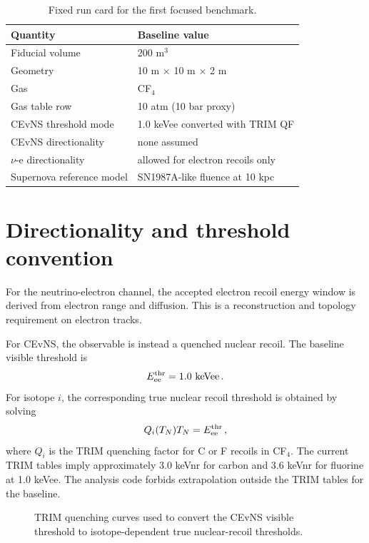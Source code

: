 \documentclass[a4paper,11pt]{article}
\begin{document}
\begin{table}[htbp]
\centering
\begin{tabular}{ll}
\hline
Quantity & Baseline value \\
\hline
Fiducial volume & 200 m$^3$ \\
Geometry & 10 m $\times$ 10 m $\times$ 2 m \\
Gas & CF$_4$ \\
Gas table row & 10 atm (10 bar proxy) \\
CEvNS threshold mode & 1.0 keVee converted with TRIM QF \\
CEvNS directionality & none assumed \\
$\nu$-e directionality & allowed for electron recoils only \\
Supernova reference model & SN1987A-like fluence at 10 kpc \\
\hline
\end{tabular}
\caption{Fixed run card for the first focused benchmark.}
\label{tab:run-card}
\end{table}

\section{Directionality and threshold convention}
\label{sec:thresholds}

For the neutrino-electron channel, the accepted electron recoil energy window is
derived from electron range and diffusion. This is a reconstruction and
topology requirement on electron tracks.

For CEvNS, the observable is instead a quenched nuclear recoil. The baseline
visible threshold is
\begin{equation}
E_{\rm ee}^{\rm thr} = 1.0~{\rm keVee} \, .
\end{equation}
For isotope $i$, the corresponding true nuclear recoil threshold is obtained by
solving
\begin{equation}
Q_i(T_N) T_N = E_{\rm ee}^{\rm thr} \, ,
\label{eq:qf-threshold}
\end{equation}
where $Q_i$ is the TRIM quenching factor for C or F recoils in CF$_4$. The
current TRIM tables imply approximately 3.0 keVnr for carbon and 3.6 keVnr for
fluorine at 1.0 keVee. The analysis code forbids extrapolation outside the TRIM
tables for the baseline.

\begin{figure}[htbp]
\centering
{}
\caption{TRIM quenching curves used to convert the CEvNS visible threshold to
isotope-dependent true nuclear-recoil thresholds.}
\label{fig:qf}
\end{figure}
\end{document}
